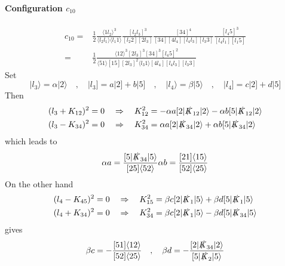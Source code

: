 \paragraph{Configuration $c_{10}$}
\begin{equation}
\begin{split}
c_{10} = &
\frac{1}{2}\frac{\langle 1l_2\rangle^3}{\langle l_2 l_1 \rangle\langle l_1 1 \rangle}
\frac{[l_2 l_3]^3}{[l_2 2 ][2 l_3]}
\frac{[34]^4}{[34][4 l_4][l_4 l_3][l_3 3]}
\frac{[l_4 5]^3}{[l_4 l_1][l_1 5]}
\\
= &
\frac{1}{2}\frac{\langle 12 \rangle^3[2l_3]^3[34]^3[l_4 5 ]^2}{\langle 51 \rangle[15][2l_3]^2\langle l_3 1\rangle [4 l_4][l_4 l_3][l_3 3]}
\end{split}
\end{equation}
Set
\begin{equation}
|l_3\rangle = \alpha |2\rangle \quad,\quad |l_3] = a|2] + b|5]
\quad,\quad
|l_4\rangle = \beta |5\rangle \quad,\quad |l_4] = c|2]+d|5]
\end{equation}
Then
\begin{equation}
\begin{split}
& (l_3 + K_{12})^2 = 0 \quad\Rightarrow\quad K_{12}^2 = - \alpha a [2|\slashed{K}_{12}|2\rangle - \alpha b [5|\slashed{K}_{12}|2\rangle
\\
& (l_3 - K_{34})^2 = 0 \quad\Rightarrow\quad K_{34}^2 = \alpha a [2|\slashed{K}_{34}|2\rangle + \alpha b [5|\slashed{K}_{34}|2\rangle
\end{split}
\end{equation}
which leads to
\begin{equation}
\alpha a = \frac{[5|\slashed{K}_{34}|5\rangle}{[25]\langle 52\rangle}
\\
\alpha b = \frac{[21]\langle 15\rangle}{[52]\langle 25\rangle}
\end{equation}
On the other hand
\begin{equation}
\begin{split}
& (l_4 - K_{45})^2 = 0 \quad\Rightarrow\quad
K_{15}^2 = \beta c[2|\slashed{K}_1|5\rangle + \beta d [5|\slashed{K}_1|5\rangle
\\
& (l_4 + K_{34})^2 = 0 \quad\Rightarrow\quad
K_{34}^2 = \beta c [2|\slashed{K}_1|5\rangle - \beta d [5|\slashed{K}_{34}|5\rangle
\end{split}
\end{equation}
gives
\begin{equation}
\beta c = - \frac{[51]\langle 12 \rangle}{[52]\langle 25 \rangle}
\quad,\quad
\beta d = - \frac{[2| \slashed{K}_{34}|2\rangle}{[5|\slashed{K}_2|5\rangle}
\end{equation}
